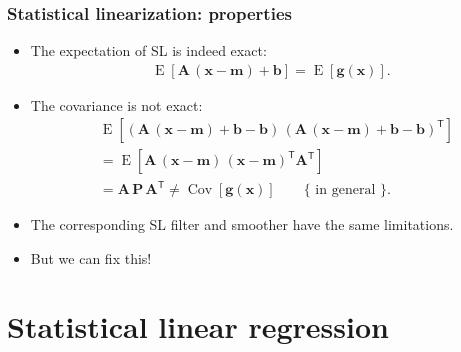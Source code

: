 \documentclass[first=dgreen,second=purple,presentation]{elecslides}
\newcommand{\mbf}[1]{\mathbf{#1}}
\newcommand{\T}[0]{\mathsf{T}}
\DeclareMathOperator{\Cov}{Cov}
\DeclareMathOperator{\E}{E}
\newcommand{\vb}{\mbf{b}}
\newcommand{\vg}{\mbf{g}}
\newcommand{\vm}{\mbf{m}}
\newcommand{\vx}{\mbf{x}}
\newcommand{\MA}{\mbf{A}}
\newcommand{\MP}{\mbf{P}}
\begin{document}
\begin{frame}
 \frametitle{Statistical linearization: properties}

\begin{itemize}[<+->]
\item The \alert{expectation} of SL is indeed \alert{exact}:
%
\begin{equation}
\begin{split}
  \E\left[ \MA \, (\vx - \vm) + \vb \right] = \E\left[ \vg(\vx) \right].
\end{split}
\nonumber
\end{equation}

\item The \alert{covariance is not exact}:
%
\begin{equation}
\begin{split}
  &\E\left[ (\MA \, (\vx - \vm) + \vb - \vb) \, (\MA \, (\vx - \vm) + \vb - \vb)^\T \right] \\
  &= \E\left[ \MA \, (\vx - \vm) \, (\vx - \vm)^\T \MA^\T \right] \\
  &= \MA \, \MP \, \MA^\T \ne \Cov\left[ \vg(\vx) \right]  \qquad  \{ \text{ in general } \}.
\end{split}
\nonumber
\end{equation}

\item The corresponding SL filter and smoother have the \alert{same limitations}.

\item \alert{But we can fix this!}

\end{itemize}
\end{frame}



\section{Statistical linear regression}
\end{document}
